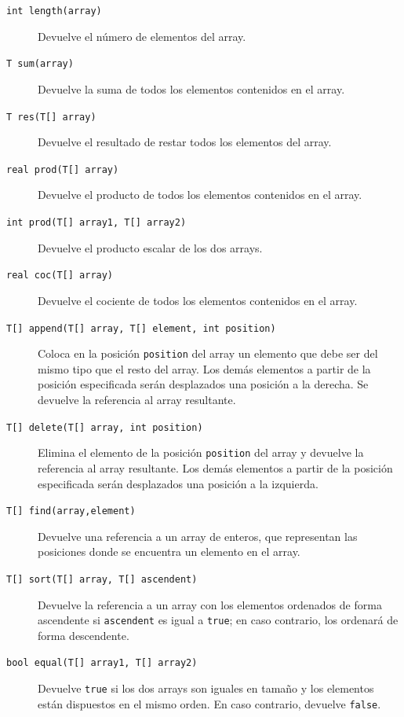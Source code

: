 \documentclass[11pt, english]{article}
\begin{document}
\begin{description}
	\begin{description}
		\item [\texttt{int length(array)}] Devuelve el número de elementos del array.
		\item [\texttt{T sum(array)}] Devuelve la suma de todos los elementos contenidos en el array.
		\item [\texttt{T res(T[] array)}] Devuelve el resultado de restar todos los elementos del array.
		\item [\texttt{real prod(T[] array)}] Devuelve el producto de todos los elementos contenidos en el array.
		\item [\texttt{int prod(T[] array1, T[] array2)}] Devuelve el producto escalar de los dos arrays.
		\item [\texttt{real coc(T[] array)}] Devuelve el cociente de todos los elementos contenidos en el array.
		\item [\texttt{T[] append(T[] array, T[] element, int position)}] Coloca en la posición \texttt{position} del array un elemento que debe ser del mismo tipo que el resto del array. Los demás elementos a partir de la posición especificada serán desplazados una posición a la derecha.
Se devuelve la referencia al array resultante.
		\item [\texttt{T[] delete(T[] array, int position)}] Elimina el elemento de la posición \texttt{position} del array y devuelve la referencia al array resultante. Los demás elementos a partir de la posición especificada serán desplazados una posición a la izquierda.
		\item [\texttt{T[] find(array,element)}] Devuelve una referencia a un array de enteros, que representan las posiciones donde se encuentra un elemento en el array.
		\item [\texttt{T[] sort(T[] array, T[] ascendent)}] Devuelve la referencia a un array con los elementos ordenados de forma ascendente si \texttt{ascendent} es igual a \texttt{true}; en caso contrario, los ordenará de forma descendente.
		\item [\texttt{bool equal(T[] array1, T[] array2)}] Devuelve \texttt{true} si los dos arrays son iguales en tamaño y los elementos están dispuestos en el mismo orden. En caso contrario, devuelve \texttt{false}.
	\end{description}
\end{description}
\end{document}

